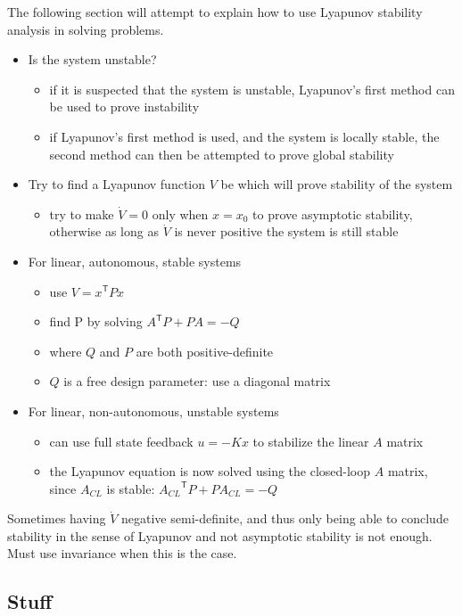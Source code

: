 The following section will attempt to explain how to use Lyapunov stability analysis in solving problems.
\begin{itemize}
  \item{Is the system unstable?}
  \begin{itemize}
    \item{if it is suspected that the system is unstable, Lyapunov's first method can be used to prove instability}
    \item{if Lyapunov's first method is used, and the system is locally stable, the second method can then be attempted to prove global stability}
  \end{itemize}
  \item{Try to find a Lyapunov function $V$ be which will prove stability of the system}
  \begin{itemize}
    \item{try to make $\dot{V} =0$ only when $x=x_{0}$ to prove asymptotic stability, otherwise as long as  $\dot{V}$ is never positive the system is still stable}
  \end{itemize}
  \item{For linear, autonomous, stable systems}
  \begin{itemize}
    \item{use $V=x^{\mathsf{T}}Px$}
    \item{find P by solving $A^{\mathsf{T}}P+PA=-Q$}
    \item{where $Q$ and $P$ are both positive-definite}
    \item{$Q$ is a free design parameter: use a diagonal matrix}
  \end{itemize}
  \item{For linear, non-autonomous, unstable systems}
  \begin{itemize}
    \item{can use full state feedback $u=-Kx$ to stabilize the linear $A$ matrix}
    \item{the Lyapunov equation is now solved using the closed-loop $A$ matrix, since $A_{CL}$ is stable: ${A_{CL}}^{\mathsf{T}}P+PA_{CL}=-Q$}
  \end{itemize}
\end{itemize}

Sometimes having $\dot{V}$ negative semi-definite, and thus only being able to conclude stability in the sense of Lyapunov and not asymptotic stability is not enough.
Must use invariance when this is the case.

\subsection{Stuff}

